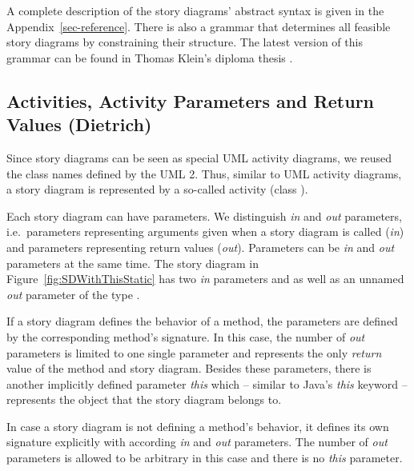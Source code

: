 A complete description of the story diagrams' abstract syntax is given in the Appendix~\ref{sec-reference}.
There is also a grammar that determines all feasible story diagrams by constraining their structure.
The latest version of this grammar can be found in Thomas Klein's diploma thesis \cite{Kle99}.



\subsection{Activities, Activity Parameters and Return Values (Dietrich)}\label{sec:activities}

Since story diagrams can be seen as special UML activity diagrams, we reused the class names defined by the UML 2.
Thus, similar to UML activity diagrams, a story diagram is represented by a so-called activity (class ).

Each story diagram can have parameters.
We distinguish \emph{in} and \emph{out} parameters,
i.e.\ parameters representing arguments given when a story diagram is called (\emph{in})
and parameters representing return values (\emph{out}).
Parameters can be \emph{in} and \emph{out} parameters at the same time.
The story diagram in Figure~\ref{fig:SDWithThisStatic} has two \emph{in} parameters  and 
as well as an unnamed \emph{out} parameter of the type .


If a story diagram defines the behavior of a method, the parameters are defined by the corresponding method's signature.
In this case, the number of \emph{out} parameters is limited to one single parameter and represents the only \emph{return} value of the method and story diagram.
Besides these parameters, there is another implicitly defined parameter \emph{this}
which -- similar to Java's \emph{this} keyword -- represents the object that the story diagram belongs to.

In case a story diagram is not defining a method's behavior, it defines its own signature explicitly with according \emph{in} and \emph{out} parameters.
The number of \emph{out} parameters is allowed to be arbitrary in this case and there is no \emph{this} parameter.

